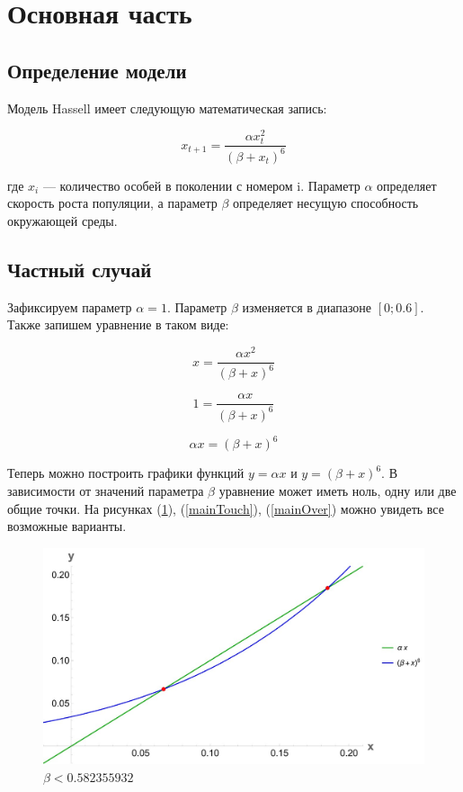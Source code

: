 
\section{Основная часть}

    \subsection{Определение модели}

        Модель Hassell имеет следующую математическая запись:

        \[x_{t+1} = \frac{\alpha x_t^2}{(\beta + x_t)^6}\]

        где \(x_i\) --- количество особей в поколении с номером i. Параметр \(\alpha\) определяет скорость роста популяции, а параметр \(\beta\) определяет несущую способность окружающей среды.
    
    \subsection{Частный случай}
    
        Зафиксируем параметр \(\alpha = 1\). Параметр \(\beta\) изменяется в диапазоне \([0; 0.6]\). Также запишем уравнение в таком виде:

        \[x = \frac{\alpha x^2}{(\beta + x)^6}\]
    
        \[1 = \frac{\alpha x}{(\beta + x)^6}\]

        \[\alpha x = (\beta + x)^6\]

        Теперь можно построить графики функций \(y = \alpha x\) и \(y = (\beta + x)^6\). В зависимости от значений параметра \(\beta\) уравнение может иметь ноль, одну или две общие точки. На рисунках (\ref{mainIntersect}), (\ref{mainTouch}), (\ref{mainOver}) можно увидеть все возможные варианты.
        
        \begin{figure}
            \centering
            \includegraphics[width=\textwidth]{images/main_intersect.jpg}

            \captionsetup{justification=centering}
            \caption{\(\beta < 0.582355932\)}
            \label{mainIntersect}
        \end{figure}

